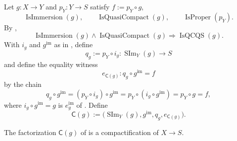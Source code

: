 \begin{definition}
  \label{def:nagata-immersion-compactification}
  \lean{}

  Let $g\colon X\to Y$ and $p_Y\colon Y\to S$ satisfy
  $f:=p_Y\circ g$,
  \[
    \operatorname{IsImmersion}(g),\qquad
    \operatorname{IsQuasiCompact}(g),\qquad
    \operatorname{IsProper}(p_Y).
  \]
  By ,
  \[
    \operatorname{IsImmersion}(g)\wedge
    \operatorname{IsQuasiCompact}(g)
      \Longrightarrow\operatorname{IsQCQS}(g).                  \tag{IC-1}
  \]
  With $i_g$ and $g^{\mathrm{im}}$ as in
  ,
  define
  \[
    q_g:=p_Y\circ i_g\colon\operatorname{SIm}_Y(g)\to S
  \]
  and define the equality witness
  \[
    e_{\mathsf C(g)}\colon q_g\circ g^{\mathrm{im}}=f
  \]
  by the chain
  \[
    q_g\circ g^{\mathrm{im}}
      =(p_Y\circ i_g)\circ g^{\mathrm{im}}
      =p_Y\circ(i_g\circ g^{\mathrm{im}})
      =p_Y\circ g=f,
  \]
  where $i_g\circ g^{\mathrm{im}}=g$ is
  $e_g^{\mathrm{im}}$ of .  Define
  \[
    \mathsf C(g):=
      \bigl(\operatorname{SIm}_Y(g),g^{\mathrm{im}},q_g,
        e_{\mathsf C(g)}\bigr).
  \]
\end{definition}

\begin{lemma}
  \label{lemma:nagata-immersion-into-proper}
  \lean{}

  The factorization $\mathsf C(g)$ of
   is a compactification of
  $X\to S$.
\end{lemma}

